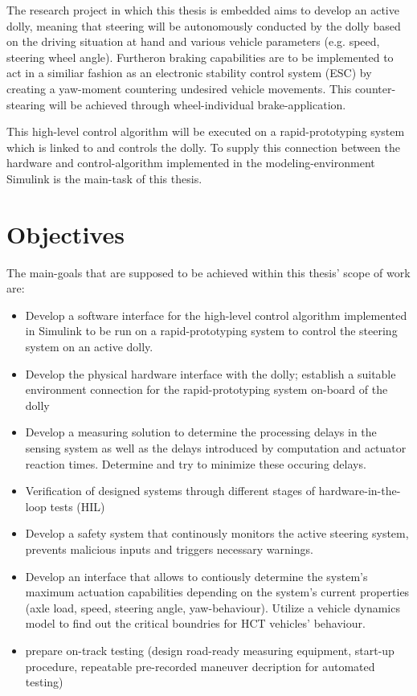 \documentclass[ExampleMasters.tex]{subfiles}
\begin{document}
The research project in which this thesis is embedded aims to develop an active dolly, meaning that steering will be autonomously conducted by the dolly based on the driving situation at hand and various vehicle parameters (e.g. speed, steering wheel angle). Furtheron braking capabilities are to be implemented to act in a similiar fashion as an electronic stability control system (ESC) by creating a yaw-moment countering undesired vehicle movements. This counter-stearing will be achieved through wheel-individual brake-application. 

This high-level control algorithm will be executed on a rapid-prototyping system which is linked to and controls the dolly. To supply this connection between the hardware and control-algorithm implemented in the modeling-environment Simulink is the main-task of this thesis.    

\section{Objectives}
\label{sec:objectives}
The main-goals that are supposed to be achieved within this thesis' scope of work are: 

\begin{itemize}
	\item{Develop a software interface for the high-level control algorithm implemented in Simulink to be run on a rapid-prototyping system to control the steering system on an active dolly. }
	\item{Develop the physical hardware interface with the dolly; establish a suitable environment connection for the rapid-prototyping system on-board of the dolly} 
	\item{Develop a measuring solution to determine the processing delays in the sensing system as well as the delays introduced by computation and actuator reaction times. Determine and try to minimize these occuring delays.}  
	\item{Verification of designed systems through different stages of hardware-in-the-loop tests (HIL)}
	\item{Develop a safety system that continously monitors the active steering system, prevents malicious inputs and triggers necessary warnings.}
	\item{Develop an interface that allows to contiously determine the system's maximum actuation capabilities depending on the system's current properties (axle load, speed, steering angle, yaw-behaviour). Utilize a vehicle dynamics model to find out the critical boundries for HCT vehicles' behaviour.}	
	\item{prepare on-track testing (design road-ready measuring equipment, start-up procedure, repeatable pre-recorded maneuver decription for automated testing)}
	
\end{itemize}
\end{document}
